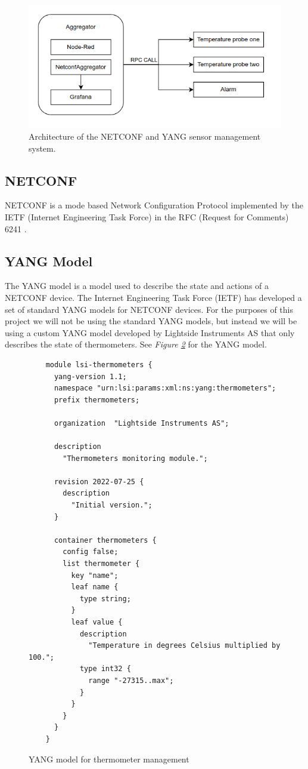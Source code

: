 \documentclass[12pt]{article}
\begin{document}
\begin{figure}
  \centering
  \includegraphics[width=\textwidth]{refimparch2.drawio.png}
  \caption{Architecture of the NETCONF and YANG sensor management system.}
  \label{fig:architecture}
\end{figure}

\newpage

\subsection{NETCONF}
NETCONF \cite{ennsNetworkConfigurationProtocol2011} is a mode based Network Configuration Protocol
implemented by the IETF (Internet Engineering Task Force) in the RFC (Request for Comments) 6241 \cite{ennsNetworkConfigurationProtocol2011}.

\subsection{YANG Model}
The YANG model is a model used to describe the state and actions of a NETCONF device.
The Internet Engineering Task Force (IETF) has developed a set of standard YANG models for NETCONF devices.
For the purposes of this project we will not be using the standard YANG models,
but instead we will be using a custom YANG model developed by Lightside Instruments AS that only 
describes the state of thermometers. See \textit{Figure \ref{fig:yang}} for the YANG model.
\begin{figure}
  \begin{verbatim}
    module lsi-thermometers {
      yang-version 1.1;
      namespace "urn:lsi:params:xml:ns:yang:thermometers";
      prefix thermometers;

      organization  "Lightside Instruments AS";

      description
        "Thermometers monitoring module.";

      revision 2022-07-25 {
        description
          "Initial version.";
      }

      container thermometers {
        config false;
        list thermometer {
          key "name";
          leaf name {
            type string;
          }
          leaf value {
            description
              "Temperature in degrees Celsius multiplied by 100.";
            type int32 {
              range "-27315..max";
            }
          }
        }
      }
    }
  \end{verbatim}
  \caption{YANG model for thermometer management}
  \label{fig:yang}
\end{figure}
\end{document}

